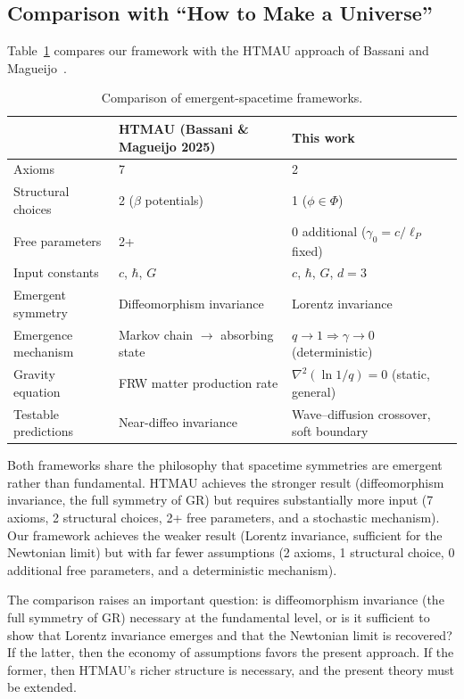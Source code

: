 \documentclass[aps,prd,twocolumn,showpacs,superscriptaddress,preprintnumbers]{revtex4-2}
\begin{document}
\subsection{Comparison with ``How to Make a Universe''}

Table~\ref{tab:compare_htmau} compares our framework with the HTMAU approach of Bassani and Magueijo~\cite{Bassani:2025htma}.

\begin{table}[h]
\centering
\caption{Comparison of emergent-spacetime frameworks.}
\label{tab:compare_htmau}
\begin{tabular}{p{}p{}p{}}
\toprule
& \textbf{HTMAU (Bassani \& Magueijo 2025)} & \textbf{This work} \\
\midrule
Axioms & 7 & 2 \\
Structural choices & 2 ($\beta$ potentials) & 1 ($\phi\in\Phi$) \\
Free parameters & 2+ & 0 additional ($\gamma_0=c/\ell_P$ fixed) \\
Input constants & $c$, $\hbar$, $G$ & $c$, $\hbar$, $G$, $d=3$ \\
Emergent symmetry & Diffeomorphism invariance & Lorentz invariance \\
Emergence mechanism & Markov chain $\to$ absorbing state & $q\to1 \Rightarrow \gamma\to0$ (deterministic) \\
Gravity equation & FRW matter production rate & $\nabla^2(\ln 1/q)=0$ (static, general) \\
Testable predictions & Near-diffeo invariance & Wave--diffusion crossover, soft boundary \\
\bottomrule
\end{tabular}
\end{table}

Both frameworks share the philosophy that spacetime symmetries are emergent rather than fundamental.
HTMAU achieves the stronger result (diffeomorphism invariance, the full symmetry of GR) but requires substantially more input (7 axioms, 2 structural choices, 2+ free parameters, and a stochastic mechanism).
Our framework achieves the weaker result (Lorentz invariance, sufficient for the Newtonian limit) but with far fewer assumptions (2 axioms, 1 structural choice, 0 additional free parameters, and a deterministic mechanism).

The comparison raises an important question: is diffeomorphism invariance (the full symmetry of GR) necessary at the fundamental level, or is it sufficient to show that Lorentz invariance emerges and that the Newtonian limit is recovered?
If the latter, then the economy of assumptions favors the present approach.
If the former, then HTMAU's richer structure is necessary, and the present theory must be extended.
\end{document}

